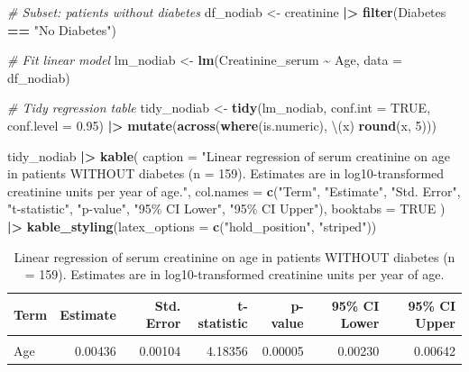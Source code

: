 \documentclass[
  12pt,
]{article}
\newenvironment{Shaded}{\begin{snugshade}}{\end{snugshade}}
\newcommand{\AttributeTok}[1]{\textcolor[rgb]{0.13,0.29,0.53}{#1}}
\newcommand{\CommentTok}[1]{\textcolor[rgb]{0.56,0.35,0.01}{\textit{#1}}}
\newcommand{\ConstantTok}[1]{\textcolor[rgb]{0.56,0.35,0.01}{#1}}
\newcommand{\DecValTok}[1]{\textcolor[rgb]{0.00,0.00,0.81}{#1}}
\newcommand{\FloatTok}[1]{\textcolor[rgb]{0.00,0.00,0.81}{#1}}
\newcommand{\FunctionTok}[1]{\textcolor[rgb]{0.13,0.29,0.53}{\textbf{#1}}}
\newcommand{\NormalTok}[1]{#1}
\newcommand{\OtherTok}[1]{\textcolor[rgb]{0.56,0.35,0.01}{#1}}
\newcommand{\SpecialCharTok}[1]{\textcolor[rgb]{0.81,0.36,0.00}{\textbf{#1}}}
\newcommand{\StringTok}[1]{\textcolor[rgb]{0.31,0.60,0.02}{#1}}
\begin{document}
\begin{Shaded}
\begin{Highlighting}[]
\CommentTok{\# Subset: patients without diabetes}
\NormalTok{df\_nodiab }\OtherTok{\textless{}{-}}\NormalTok{ creatinine }\SpecialCharTok{|\textgreater{}} \FunctionTok{filter}\NormalTok{(Diabetes }\SpecialCharTok{==} \StringTok{"No Diabetes"}\NormalTok{)}

\CommentTok{\# Fit linear model}
\NormalTok{lm\_nodiab }\OtherTok{\textless{}{-}} \FunctionTok{lm}\NormalTok{(Creatinine\_serum }\SpecialCharTok{\textasciitilde{}}\NormalTok{ Age, }\AttributeTok{data =}\NormalTok{ df\_nodiab)}

\CommentTok{\# Tidy regression table}
\NormalTok{tidy\_nodiab }\OtherTok{\textless{}{-}} \FunctionTok{tidy}\NormalTok{(lm\_nodiab, }\AttributeTok{conf.int =} \ConstantTok{TRUE}\NormalTok{, }\AttributeTok{conf.level =} \FloatTok{0.95}\NormalTok{) }\SpecialCharTok{|\textgreater{}}
  \FunctionTok{mutate}\NormalTok{(}\FunctionTok{across}\NormalTok{(}\FunctionTok{where}\NormalTok{(is.numeric), \textbackslash{}(x) }\FunctionTok{round}\NormalTok{(x, }\DecValTok{5}\NormalTok{)))}

\NormalTok{tidy\_nodiab }\SpecialCharTok{|\textgreater{}}
  \FunctionTok{kable}\NormalTok{(}
    \AttributeTok{caption   =} \StringTok{"Linear regression of serum creatinine on age in patients WITHOUT diabetes (n = 159). Estimates are in log10{-}transformed creatinine units per year of age."}\NormalTok{,}
    \AttributeTok{col.names =} \FunctionTok{c}\NormalTok{(}\StringTok{"Term"}\NormalTok{, }\StringTok{"Estimate"}\NormalTok{, }\StringTok{"Std. Error"}\NormalTok{, }\StringTok{"t{-}statistic"}\NormalTok{, }\StringTok{"p{-}value"}\NormalTok{, }\StringTok{"95\% CI Lower"}\NormalTok{, }\StringTok{"95\% CI Upper"}\NormalTok{),}
    \AttributeTok{booktabs  =} \ConstantTok{TRUE}
\NormalTok{  ) }\SpecialCharTok{|\textgreater{}}
  \FunctionTok{kable\_styling}\NormalTok{(}\AttributeTok{latex\_options =} \FunctionTok{c}\NormalTok{(}\StringTok{"hold\_position"}\NormalTok{, }\StringTok{"striped"}\NormalTok{))}
\end{Highlighting}
\end{Shaded}

\begin{longtable}[t]{lrrrrrr}
\caption{\label{tab:task-g-lm-nodiabetes}Linear regression of serum creatinine on age in patients WITHOUT diabetes (n = 159). Estimates are in log10-transformed creatinine units per year of age.}\\
\toprule
Term & Estimate & Std. Error & t-statistic & p-value & 95\% CI Lower & 95\% CI Upper\\
\midrule
\cellcolor{gray!10}{(Intercept)} & \cellcolor{gray!10}{-0.19392} & \cellcolor{gray!10}{0.06576} & \cellcolor{gray!10}{-2.94893} & \cellcolor{gray!10}{0.00364} & \cellcolor{gray!10}{-0.32373} & \cellcolor{gray!10}{-0.06410}\\
Age & 0.00436 & 0.00104 & 4.18356 & 0.00005 & 0.00230 & 0.00642\\
\bottomrule
\end{longtable}
\end{document}
